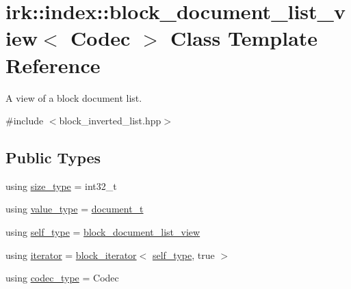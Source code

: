 \hypertarget{classirk_1_1index_1_1block__document__list__view}{}\section{irk\+:\+:index\+:\+:block\+\_\+document\+\_\+list\+\_\+view$<$ Codec $>$ Class Template Reference}
\label{classirk_1_1index_1_1block__document__list__view}


A view of a block document list.  




{\ttfamily \#include $<$block\+\_\+inverted\+\_\+list.\+hpp$>$}

\subsection*{Public Types}
\begin{DoxyCompactItemize}
\item 
using \mbox{\hyperlink{classirk_1_1index_1_1block__document__list__view_abc1e76d262386112c4591362fc660dda}{size\+\_\+type}} = int32\+\_\+t
\item 
using \mbox{\hyperlink{classirk_1_1index_1_1block__document__list__view_a06e2f36c5850de123fefa071ae56da92}{value\+\_\+type}} = \mbox{\hyperlink{namespaceirk_1_1index_af829dedea20da89f9b51b49d78f57006}{document\+\_\+t}}
\item 
using \mbox{\hyperlink{classirk_1_1index_1_1block__document__list__view_aaf5438363796f98a08a115e2a6316659}{self\+\_\+type}} = \mbox{\hyperlink{classirk_1_1index_1_1block__document__list__view}{block\+\_\+document\+\_\+list\+\_\+view}}
\item 
using \mbox{\hyperlink{classirk_1_1index_1_1block__document__list__view_afc4738502c6c0b43f8487be16136feec}{iterator}} = \mbox{\hyperlink{classirk_1_1index_1_1block__iterator}{block\+\_\+iterator}}$<$ \mbox{\hyperlink{classirk_1_1index_1_1block__document__list__view_aaf5438363796f98a08a115e2a6316659}{self\+\_\+type}}, true $>$
\item 
using \mbox{\hyperlink{classirk_1_1index_1_1block__document__list__view_ac08980dc0eeb9fea5528fb110a2ce734}{codec\+\_\+type}} = Codec
\end{DoxyCompactItemize}
